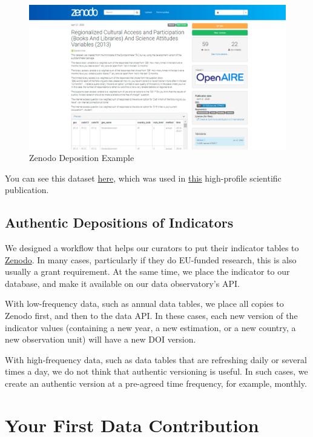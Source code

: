 \documentclass[
  a4paper,
  openany, a4paper, oneside]{book}
\begin{document}
\begin{figure}

{\centering \includegraphics[width=0.8\linewidth]{plots/screenshots/zenodo_deposition_example} 

}

\caption{Zenodo Deposition Example}\label{fig:zenodo-example}
\end{figure}

You can see this dataset \href{https://zenodo.org/record/3759811\#.YJ6R3qgzbIU}{here}, which was used in \href{https://dataandlyrics.com/publication/scholarly_pirate_libraries_2020/}{this} high-profile scientific publication.

\hypertarget{deposit-indicator}{%
\subsection{Authentic Depositions of Indicators}\label{deposit-indicator}}

We designed a workflow that helps our curators to put their indicator tables to \href{https://zenodo.org/}{Zenodo}. In many cases, particularly if they do EU-funded research, this is also usually a grant requirement. At the same time, we place the indicator to our database, and make it available on our data observatory's API.

With low-frequency data, such as annual data tables, we place all copies to Zenodo first, and then to the data API. In these cases, each new version of the indicator values (containing a new year, a new estimation, or a new country, a new observation unit) will have a new DOI version.

With high-frequency data, such as data tables that are refreshing daily or several times a day, we do not think that authentic versioning is useful. In such cases, we create an authentic version at a pre-agreed time frequency, for example, monthly.

\hypertarget{your-first-data-contribution}{%
\section{Your First Data Contribution}\label{your-first-data-contribution}}
\end{document}
